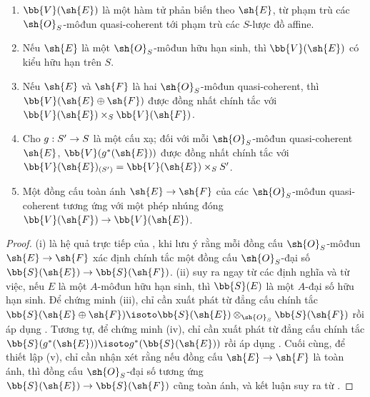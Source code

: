 \documentclass[oneside,10pt]{amsart}
\makeatletter
\newcommand{\ega@arrow}[2]{\mathchoice{#1}{#2}{#2}{#2}}
\renewcommand{\to}{\ega@arrow{\longrightarrow}{\rightarrow}}
\let\EGAOriginalLabel\label
\renewcommand{\label}[1]{\phantomsection\EGAOriginalLabel{#1}}
\makeatother
\begin{document}
\begin{proposition}[1.7.11]
\label{II.1.7.11}
\medskip\noindent
\begin{enumerate}
  \item[{\rm(i)}] $\bb{V}(\sh{E})$ là một hàm tử phản biến theo $\sh{E}$, từ phạm trù các $\sh{O}_S$-môđun quasi-coherent tới phạm trù các $S$-lược đồ affine.
  \item[{\rm(ii)}] Nếu $\sh{E}$ là một $\sh{O}_S$-môđun hữu hạn sinh, thì $\bb{V}(\sh{E})$ có kiểu hữu hạn trên $S$.
  \item[{\rm(iii)}] Nếu $\sh{E}$ và $\sh{F}$ là hai $\sh{O}_S$-môđun quasi-coherent, thì $\bb{V}(\sh{E}\oplus\sh{F})$ được đồng nhất chính tắc với $\bb{V}(\sh{E})\times_S\bb{V}(\sh{F})$.
  \item[{\rm(iv)}] Cho $g:S'\to S$ là một cấu xạ; đối với mỗi $\sh{O}_S$-môđun quasi-coherent $\sh{E}$, $\bb{V}(g^*(\sh{E}))$ được đồng nhất chính tắc với $\bb{V}(\sh{E})_{(S')}=\bb{V}(\sh{E})\times_S S'$.
  \item[{\rm(v)}] Một đồng cấu toàn ánh $\sh{E}\to\sh{F}$ của các $\sh{O}_S$-môđun quasi-coherent tương ứng với một phép nhúng đóng $\bb{V}(\sh{F})\to\bb{V}(\sh{E})$.
\end{enumerate}
\end{proposition}

\begin{proof}
(i) là hệ quả trực tiếp của , khi lưu ý rằng mỗi đồng cấu $\sh{O}_S$-môđun $\sh{E}\to\sh{F}$ xác định chính tắc một đồng cấu $\sh{O}_S$-đại số $\bb{S}(\sh{E})\to\bb{S}(\sh{F})$.
(ii) suy ra ngay từ các định nghĩa  và từ việc, nếu $E$ là một $A$-môđun hữu hạn sinh, thì $\bb{S}(E)$ là một $A$-đại số hữu hạn sinh.
Để chứng minh (iii), chỉ cần xuất phát từ đẳng cấu chính tắc $\bb{S}(\sh{E}\oplus\sh{F})\isoto\bb{S}(\sh{E})\otimes_{\sh{O}_S}\bb{S}(\sh{F})$  rồi áp dụng .
Tương tự, để chứng minh (iv), chỉ cần xuất phát từ đẳng cấu chính tắc $\bb{S}(g^*(\sh{E}))\isoto g^*(\bb{S}(\sh{E}))$  rồi áp dụng .
Cuối cùng, để thiết lập (v), chỉ cần nhận xét rằng nếu đồng cấu $\sh{E}\to\sh{F}$ là toàn ánh, thì đồng cấu $\sh{O}_S$-đại số tương ứng $\bb{S}(\sh{E})\to\bb{S}(\sh{F})$ cũng toàn ánh, và kết luận suy ra từ .
\end{proof}
\end{document}
